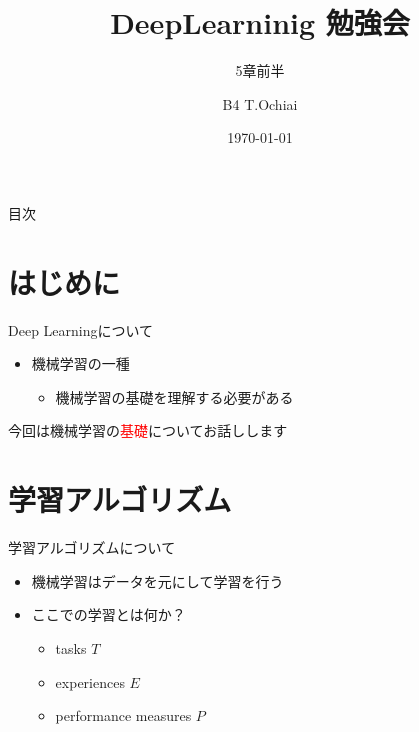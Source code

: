 \documentclass[dvipdfmx, 10pt]{beamer}
\title[]{DeepLearninig 勉強会}
\subtitle{5章前半}
\author[T.Ochiai]{B4 T.Ochiai}
\date[\today]{\today}
\institute[NIT]{Nagoya Institute of Technology \\ Takeuchi \& Karasuyama Lab}
\newcommand{\green}[1]{\textcolor{green!40!black}{#1}}
\begin{document}

\begin{frame}[plain]
\titlepage
\end{frame}


\begin{frame}{目次}
\tableofcontents[hideallsubsections]
\end{frame}


\section{はじめに}


\begin{frame}{Deep Learningについて}
  \begin{itemize}
    \item 機械学習の一種
    \begin{itemize}
      \item 機械学習の基礎を理解する必要がある
    \end{itemize}
  \end{itemize}
  \centering 今回は機械学習の\textcolor{red}{基礎}についてお話しします
  
\end{frame}


\section{学習アルゴリズム}


\begin{frame}{学習アルゴリズムについて}
  \begin{itemize}
    \item 機械学習はデータを元にして学習を行う
    \item ここでの学習とは何か？
    \begin{itemize}
      \item tasks $T$
      \item experiences $E$
      \item performance measures $P$
    \end{itemize}
  \end{itemize}
\end{frame}
\end{document}
